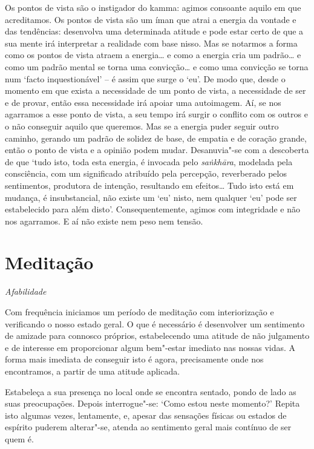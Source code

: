 Os pontos de vista são o instigador do kamma: agimos consoante aquilo em que
acreditamos. Os pontos de vista são um íman que atrai a energia da vontade e das
tendências: desenvolva uma determinada atitude e pode estar certo de que a sua
mente irá interpretar a realidade com base nisso. Mas se notarmos a forma como
os pontos de vista atraem a energia\ldots{} e como a energia cria um padrão\ldots{} e como
um padrão mental se torna uma convicção\ldots{} e como uma convicção se torna num
`facto inquestionável' -- é assim que surge o `eu'. De modo que, desde o momento
em que exista a necessidade de um ponto de vista, a necessidade de ser e de
provar, então essa necessidade irá apoiar uma autoimagem. Aí, se nos agarramos a
esse ponto de vista, a seu tempo irá surgir o conflito com os outros e o não
conseguir aquilo que queremos. Mas se a energia puder seguir outro caminho,
gerando um padrão de solidez de base, de empatia e de coração grande, então o
ponto de vista e a opinião podem mudar. Desanuvia"-se com a descoberta de que
`tudo isto, toda esta energia, é invocada pelo \emph{saṅkhāra}, modelada pela
consciência, com um significado atribuído pela percepção, reverberado pelos
sentimentos, produtora de intenção, resultando em efeitos\ldots{} Tudo isto está em
mudança, é insubstancial, não existe um `eu' nisto, nem qualquer `eu' pode ser
estabelecido para além disto'. Consequentemente, agimos com integridade e não
nos agarramos. E aí não existe nem peso nem tensão.

\clearpage

\section[Meditação: afabilidade]{Meditação}

{\centering
\subSectionFont\selectfont
\textit{Afabilidade}
\par}

\bigskip

Com frequência iniciamos um período de meditação com interiorização e
verificando o nosso estado geral. O que é necessário é desenvolver um sentimento
de amizade para connosco próprios, estabelecendo uma atitude de não julgamento e
de interesse em proporcionar algum bem"-estar imediato nas nossas vidas. A forma
mais imediata de conseguir isto é agora, precisamente onde nos encontramos, a
partir de uma atitude aplicada.

Estabeleça a sua presença no local onde se encontra sentado, pondo de lado as
suas preocupações. Depois interrogue"-se: `Como estou neste momento?' Repita isto
algumas vezes, lentamente, e, apesar das sensações físicas ou estados de
espírito puderem alterar"-se, atenda ao sentimento geral mais contínuo de ser
quem é.

